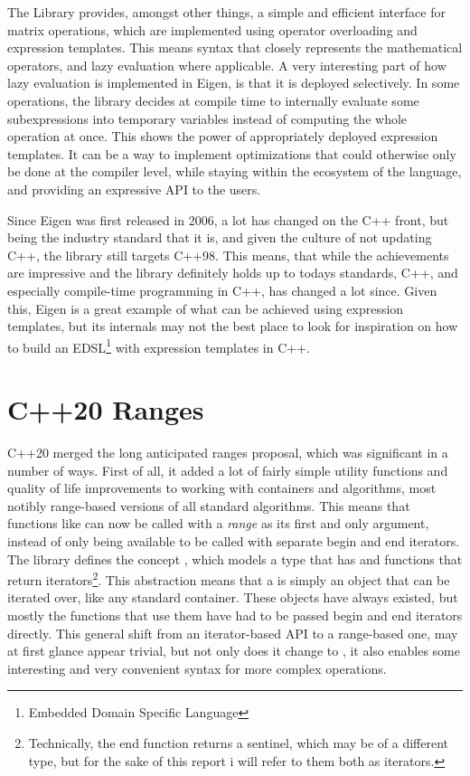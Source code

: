 The Library provides, amongst other things, a simple and efficient interface for matrix operations, which are
implemented using operator overloading and expression templates. This means syntax that closely represents
the mathematical operators, and lazy evaluation where applicable. A very interesting part of how lazy
evaluation is implemented in Eigen, is that it is deployed selectively. In some operations, the library
decides at compile time to internally evaluate some subexpressions into temporary variables instead of
computing the whole operation at once. This shows the power of appropriately deployed expression templates.
It can be a way to implement optimizations that could otherwise only be done at the compiler level, while
staying within the ecosystem of the language, and providing an expressive API to the users.

Since Eigen was first released in 2006, a lot has changed on the C++ front, but being the industry standard
that it is, and given the culture of not updating C++, the library still targets C++98. This means, that
while the achievements are impressive and the library definitely holds up to todays standards, C++, and
especially compile-time programming in C++, has changed a lot since. Given this, Eigen is a great example of
what can be achieved using expression templates, but its internals may not the best place to look for
inspiration on how to build an EDSL\footnote{Embedded Domain Specific Language} with expression templates in C++.

\section{C++20 Ranges}

C++20\autocite{C++Std} merged the long anticipated ranges proposal\autocite{P0896R4}, which was
significant in a number of ways. First of all, it added a lot of fairly simple utility functions and quality
of life improvements to working with containers and algorithms, most notibly range-based versions of all
standard algorithms. This means that functions like  can now be called with a \emph{range} as its first and only
argument, instead of only being available to be called with separate begin and end iterators. The library
defines the concept , which models a type that has  and  functions that return iterators\footnote{Technically, the end function
returns a sentinel, which may be of a different type, but for the sake of this report i will refer to them
both as iterators.}. This abstraction means that a  is simply an object that can be iterated over, like any standard container. These objects have always existed, but mostly the functions that use them have had to be passed begin and end iterators directly. This general shift from an iterator-based API to a range-based one, may at first glance appear trivial, but not only does it change 
to , it also enables some interesting and very convenient syntax for more complex
operations.

